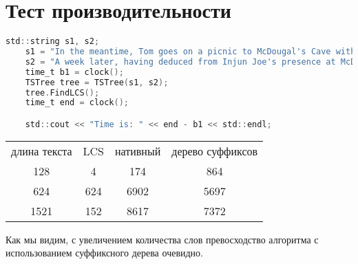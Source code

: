 \section{Тест производительности}
\begin{lstlisting}[language=C]
	std::string s1, s2;
    s1 = "In the meantime, Tom goes on a picnic to McDougal's Cave with Becky and their classmates. However, Tom and Becky get lost and end up wandering in the extensive cave complex for the several days, facing starvation and dehydration. Becky becomes extremely dehydrated and weak, and Tom's search for a way out grows more desperate. He accidentally encounters Injun Joe in the caves one day, but is not seen by his nemesis. Eventually, Tom finds a way out, and they are joyfully welcomed back by their community. As a preventive measure, Judge Thatcher, Becky's father, has McDougal's Cave sealed off with an iron door. When Tom hears of the sealing two weeks later, he is horror-stricken, knowing that Injun Joe is still inside. He directs a posse to the cave, where they find Injun Joe's corpse just inside the sealed entrance, starved to death after having desperately consumed raw bats and candle stubs as a last resort. The place of his death, and specifically the in situ cup he used to collect water from a dripping stalactite, becomes a local tourist attraction. Tom and others in the town feel pity at the horribly cruel death, despite Injun Joe's wickedness, and a petition is started to the governor to posthumously pardon him.";
    s2 = "A week later, having deduced from Injun Joe's presence at McDougal's Cave that the villain must have hidden the stolen gold inside, Tom takes Huck to the cave and they find the box of gold, the proceeds of which are invested for them. The Widow Douglas adopts Huck, but he finds the restrictions of a civilized home life painful, attempting to escape back to his vagrant life. Tom tricks him into thinking that he can later join Tom's new scheme of starting a robber band if he returns to the widow. Reluctantly, Huck agrees and goes back to the widow. ";
    time_t b1 = clock();
    TSTree tree = TSTree(s1, s2);
    tree.FindLCS();
    time_t end = clock();

    std::cout << "Time is: " << end - b1 << std::endl;

\end{lstlisting}

\begin{center}
\begin{table}[h]

\label{tabular:timesandtenses}

\begin{tabular}{c|c|c|c}
длина текста & LCS & нативный & дерево суффиксов\\

128 & 4 & 174 & 864\\
624 & 624 & 6902 & 5697\\
1521 & 152 & 8617 & 7372\\
\end{tabular}
\end{table}
\end{center}
Как мы видим, с увеличением количества слов превосходство алгоритма с использованием суффиксного дерева очевидно.
 
\pagebreak
